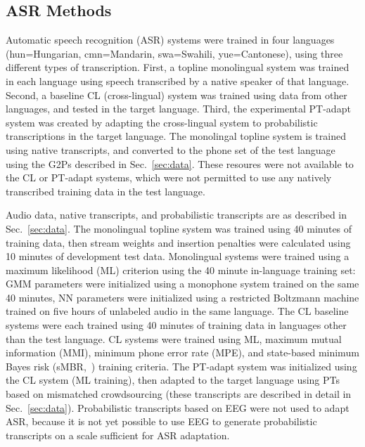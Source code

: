 \subsection{ASR Methods}
\label{sec:mlbaseline}

Automatic speech recognition (ASR) systems were trained
in four languages (hun=Hungarian, cmn=Mandarin, swa=Swahili,
yue=Cantonese), using three different types of transcription.
First, a topline {\sc monolingual} system was trained in each
language using speech transcribed by a native speaker of that
language.  Second, a baseline {\sc CL} (cross-lingual) system was
trained using data from other languages, and tested in the target
language.  Third, the experimental {\sc PT-adapt} system was created
by adapting the cross-lingual system to probabilistic transcriptions
in the target language.  The {\sc monolingal} topline system is
trained using native transcripts, and converted to the phone set of
the test language using the G2Ps described in Sec.~\ref{sec:data}.
These resoures were not available to the {\sc CL} or {\sc PT-adapt}
systems, which were not permitted to use any natively transcribed
training data in the test language.

Audio data, native transcripts, and probabilistic
transcripts are as described in Sec.~\ref{sec:data}.  The {\sc
  monolingual} topline system was trained using 40 minutes of
training data, then stream weights and insertion penalties were
calculated using 10 minutes of development test data.  Monolingual
systems were trained using a maximum likelihood (ML) criterion using
the 40 minute in-language training set: GMM parameters were
initialized using a monophone system trained on the same 40 minutes,
NN parameters were initialized using a restricted Boltzmann machine
trained on five hours of unlabeled audio in the same language.  The
{\sc CL} baseline systems were each trained using 40 minutes of
training data in languages other than the test language.  CL systems
were trained using ML, maximum mutual information (MMI), minimum
phone error rate (MPE), and state-based minimum Bayes risk
(sMBR,~\cite{Gibson06}) training criteria.  The {\sc PT-adapt}
system was initialized using the CL system (ML training), then
adapted to the target language using PTs based on mismatched
crowdsourcing (these transcripts are described in detail in
Sec.~\ref{sec:data}).  Probabilistic transcripts based on EEG were
not used to adapt ASR, because it is not yet possible to use EEG to
generate probabilistic transcripts on a scale sufficient for ASR
adaptation.
    
